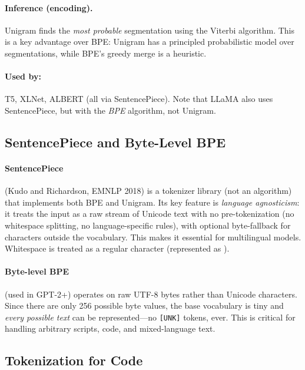 \paragraph{Inference (encoding).}
Unigram finds the \emph{most probable} segmentation using the Viterbi algorithm.  This
is a key advantage over BPE: Unigram has a principled probabilistic model over
segmentations, while BPE's greedy merge is a heuristic.

\paragraph{Used by:} T5, XLNet, ALBERT (all via SentencePiece).  Note that LLaMA also
uses SentencePiece, but with the \emph{BPE} algorithm, not Unigram.

\subsection{SentencePiece and Byte-Level BPE}

\paragraph{SentencePiece} (Kudo and Richardson, EMNLP 2018) is a tokenizer library
(not an algorithm) that implements both BPE and Unigram.  Its key feature is
\emph{language agnosticism}: it treats the input as a raw stream of Unicode text with no
pre-tokenization (no whitespace splitting, no language-specific rules), with optional
byte-fallback for characters outside the vocabulary.  This makes it
essential for multilingual models.  Whitespace is treated as a regular character
(represented as \texttt{\textunderscore}).

\paragraph{Byte-level BPE} (used in GPT-2+) operates on raw UTF-8 bytes rather than
Unicode characters.  Since there are only 256 possible byte values, the base vocabulary
is tiny and \emph{every possible text} can be represented---no \texttt{[UNK]} tokens,
ever.  This is critical for handling arbitrary scripts, code, and mixed-language text.

\subsection{Tokenization for Code}


